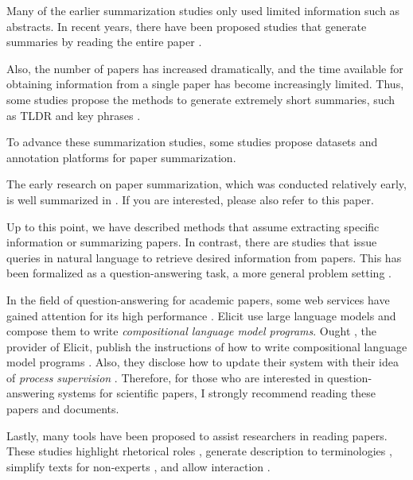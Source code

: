 \documentclass{book}
\begin{document}
Many of the earlier summarization studies only used limited information such as abstracts. In recent years, there have been proposed studies that generate summaries by reading the entire paper \cite{subramanian2019extractive,qi2022sapgraph,dong2020discourse,tretyak2020combination}.

Also, the number of papers has increased dramatically, and the time available for obtaining information from a single paper has become increasingly limited. Thus, some studies propose the methods to generate extremely short summaries, such as TLDR \cite{cachola2020tldr} and key phrases \cite{boudin2021keyphrase,garg2021keyphrase}.

To advance these summarization studies, some studies propose datasets \cite{yasunaga2019scisummnet,bastan2022sume} and annotation platforms \cite{el2022platform} for paper summarization. 

The early research on paper summarization, which was conducted relatively early, is well summarized in \cite{altmami2022automatic}. If you are interested, please also refer to this paper.

Up to this point, we have described methods that assume extracting specific information or summarizing papers. In contrast, there are studies that issue queries in natural language to retrieve desired information from papers. This has been formalized as a question-answering task, a more general problem setting \cite{lu2022learn,ruggeri2022argscichat,saikh2022scienceqa}. 

In the field of question-answering for academic papers, some web services have gained attention for its high performance \cite{elicit,scispace}. Elicit use large language models and compose them to write \textit{compositional language model programs}. Ought \cite{ought}, the provider of Elicit, publish the instructions of how to write compositional language model programs \cite{primer2022}. Also, they disclose how to update their system with their idea of \textit{process supervision} \cite{reppert2023iterated}. Therefore, for those who are interested in question-answering systems for scientific papers, I strongly recommend reading these papers and documents.

Lastly, many tools have been proposed to assist researchers in reading papers. These studies highlight rhetorical roles \cite{fok2023scim,lauscher2018arguminsci}, generate description to terminologies \cite{august2022generating,head2021augmenting,murthy2022accord}, simplify texts for non-experts \cite{august2022paper,jeblick2022chatgpt}, and allow interaction \cite{kang2022threddy,elicit,scispace}.
\end{document}
